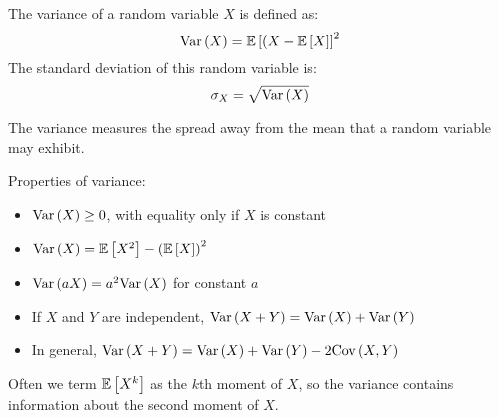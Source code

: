 \begin{definition} 
    The variance of a random variable $X$ is defined as:
    \[ \text{Var}\left( X \right) = \mathbb{E}\left[ (X - \mathbb{E}\left[ X \right] \right]^2 \]
    The standard deviation of this random variable is:
    \[ \sigma_X = \sqrt{\text{Var}\left( X \right)} \]
\end{definition}

The variance measures the spread away from the mean that a random variable may exhibit.

\begin{theorem}
    Properties of variance:
    \begin{itemize}
        \item $\text{Var}\left( X \right) \geq 0$, with equality only if $X$ is constant
        \item $\text{Var}\left( X \right) = \mathbb{E}\left[ X^2 \right] - \qty(\mathbb{E}\left[ X \right])^2$
        \item $\text{Var}\left( aX \right) = a^2 \text{Var}\left( X \right)$ for constant $a$
        \item If $X$ and $Y$ are independent, $\text{Var}\left( X + Y \right) = \text{Var}\left( X \right) + \text{Var}\left( Y \right)$
        \item In general, $\text{Var}\left( X + Y \right) = \text{Var}\left( X \right) + \text{Var}\left( Y \right) - 2 \text{Cov}\left( X, Y \right)$
    \end{itemize}
\end{theorem}

Often we term $\mathbb{E}\left[ X^k \right]$ as the $k$th moment of $X$, so the variance contains information
about the second moment of $X$.